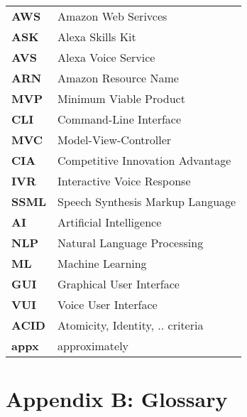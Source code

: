 \begin{flushleft}
\begin{tabular}{ll}
\textbf{AWS}	&	Amazon Web Serivces\\
\textbf{ASK}	&	Alexa Skills Kit\\
\textbf{AVS}	&	Alexa Voice Service\\
\textbf{ARN}	&	Amazon Resource Name\\
\textbf{MVP}	&	Minimum Viable Product\\
\textbf{CLI}	&	Command-Line Interface\\
\textbf{MVC}	&	Model-View-Controller\\
\textbf{CIA}	&	Competitive Innovation Advantage\\
\textbf{IVR}	&	Interactive Voice Response\\
\textbf{SSML}	&	Speech Synthesis Markup Language\\
\textbf{AI}		&	Artificial Intelligence\\
\textbf{NLP}	&	Natural Language Processing\\
\textbf{ML}		&	Machine Learning\\
\textbf{GUI}	&	Graphical User Interface\\
\textbf{VUI}	&	Voice User Interface\\
\textbf{ACID}	&	Atomicity, Identity, .. criteria\\

\textbf{appx}	&	approximately\\
\end{tabular}
\end{flushleft}

\newpage
\section*{Appendix B: Glossary}
%

